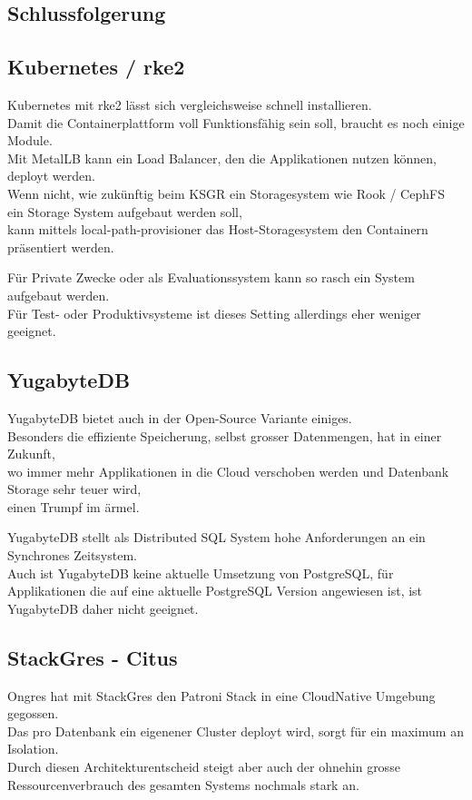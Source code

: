 
\begin{flushleft}
    \section{Schlussfolgerung}
    \subsection{\Gls{Kubernetes} / \Gls{rke2}}
    \Gls{Kubernetes} mit \Gls{rke2} lässt sich vergleichsweise schnell installieren.\\
    Damit die Containerplattform voll Funktionsfähig sein soll, braucht es noch einige Module.\\
    Mit \Gls{MetalLB} kann ein Load Balancer, den die Applikationen nutzen können, deployt werden.\\
    Wenn nicht, wie zukünftig beim KSGR ein Storagesystem wie Rook / CephFS ein Storage System aufgebaut werden soll,\\
    kann mittels \Gls{local-path-provisioner} das Host-Storagesystem den Containern präsentiert werden.
\end{flushleft}
\begin{flushleft}
    Für Private Zwecke oder als Evaluationssystem kann so rasch ein System aufgebaut werden.\\
    Für Test- oder Produktivsysteme ist dieses Setting allerdings eher weniger geeignet.
    \subsection{YugabyteDB}
    YugabyteDB bietet auch in der Open-Source Variante einiges.\\
    Besonders die effiziente Speicherung, selbst grosser Datenmengen, hat in einer Zukunft,\\
    wo immer mehr Applikationen in die Cloud verschoben werden und Datenbank Storage sehr teuer wird,\\
    einen Trumpf im ärmel.
\end{flushleft}
\begin{flushleft}
    YugabyteDB stellt als Distributed SQL System hohe Anforderungen an ein Synchrones Zeitsystem.\\
    Auch ist YugabyteDB keine aktuelle Umsetzung von \Gls{PostgreSQL}, für Applikationen die auf eine aktuelle \Gls{PostgreSQL} Version angewiesen ist, ist YugabyteDB daher nicht geeignet.
    \subsection{StackGres - Citus}
    Ongres hat mit StackGres den Patroni Stack in eine CloudNative Umgebung gegossen.\\
    Das pro Datenbank ein eigenener Cluster deployt wird, sorgt für ein maximum an Isolation.\\
    Durch diesen Architekturentscheid steigt aber auch der ohnehin grosse Ressourcenverbrauch des gesamten Systems nochmals stark an.
\end{flushleft}
